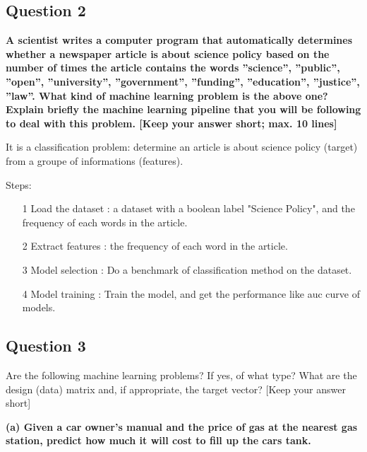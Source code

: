 \documentclass{article}
\begin{document}
\subsection{Question 2}

{\bf A scientist writes a computer program that automatically determines whether a newspaper article is about science policy based on the number of times the article contains the words ”science”, ”public”, ”open”, ”university”, ”government”, ”funding”, ”education”, ”justice”, ”law”. What kind of machine learning problem is the above one? Explain briefly the machine learning pipeline that you will be following to deal with this problem. [Keep your answer short; max. 10 lines]}

\vspace{1em}


It is a classification problem: determine an article is about science policy (target) from a groupe of informations (features).

Steps:
\begin{itemize}
	\item[1] Load the dataset : a dataset with a boolean label "Science Policy", and the frequency of each words in the article. 
	
	\item[2] Extract features : the frequency of each word in the article.
	
	\item[3] Model selection : Do a benchmark of classification method on the dataset.
	
	\item[4] Model training : Train the model, and get the performance like auc curve of models.

\end{itemize}


\subsection{Question 3}

Are the following machine learning problems? If yes, of what type? What are the design (data) matrix and, if appropriate, the target vector? [Keep your answer short]

\vspace{1em}

{\bf (a) Given a car owner’s manual and the price of gas at the nearest gas station, predict how much it will cost to fill up the cars tank.}\\
\end{document}

